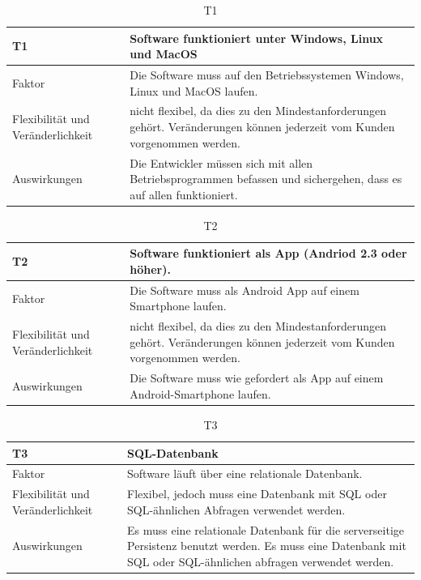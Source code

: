 \documentclass[fontsize=12pt,paper=a4,twoside]{scrartcl}
\begin{document}
\begin{table}[H]
\caption{T1}
\begin{tabular}{|p{3cm}|p{12cm}|}\hline
\textbf{T1} & \textbf{Software funktioniert unter Windows, Linux und MacOS} \\ \hline \hline
Faktor & Die Software muss auf den Betriebssystemen Windows, Linux und MacOS laufen.\\ \hline
Flexibilität und Veränderlichkeit & nicht flexibel, da dies zu den Mindestanforderungen gehört. Veränderungen können jederzeit vom Kunden vorgenommen werden.  \\ \hline
Auswirkungen & Die Entwickler müssen sich mit allen Betriebsprogrammen befassen und sichergehen, dass es auf allen funktioniert.\\ \hline
\end{tabular}
\end{table}


\begin{table}[H]
\caption{T2}
\begin{tabular}{|p{3cm}|p{12cm}|}\hline
\textbf{T2} & \textbf{Software funktioniert als App (Andriod 2.3 oder höher)}. \\ \hline \hline
Faktor & Die Software muss als Android App auf einem Smartphone laufen.\\ \hline
Flexibilität und Veränderlichkeit & nicht flexibel, da dies zu den Mindestanforderungen gehört. Veränderungen können jederzeit vom Kunden vorgenommen werden.  \\ \hline
Auswirkungen & Die Software muss wie gefordert als App auf einem Android-Smartphone laufen.\\ \hline
\end{tabular}
\end{table}


\begin{table}[H]
\caption{T3}
\begin{tabular}{|p{3cm}|p{12cm}|}\hline
\textbf{T3} & \textbf{SQL-Datenbank} \\ \hline \hline
Faktor & Software läuft über eine relationale Datenbank.\\ \hline
Flexibilität und Veränderlichkeit & Flexibel, jedoch muss eine Datenbank mit SQL oder SQL-ähnlichen Abfragen verwendet werden.  \\ \hline
Auswirkungen & Es muss eine relationale Datenbank für die serverseitige Persistenz benutzt werden. Es muss eine Datenbank mit SQL oder SQL-ähnlichen abfragen verwendet werden.\\ \hline
\end{tabular}
\end{table}
\end{document}

